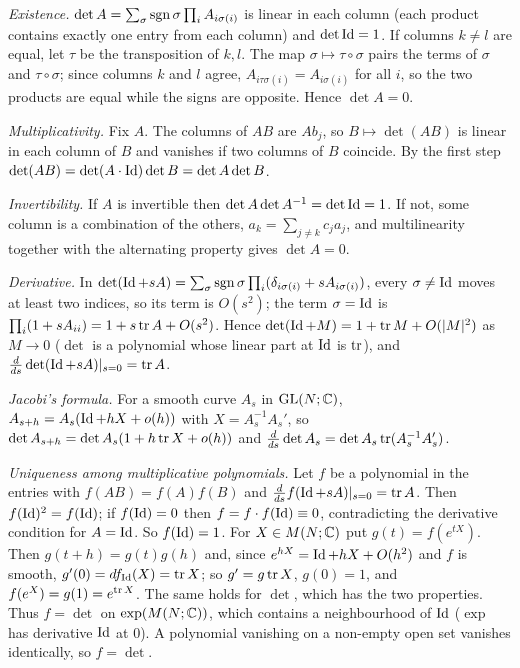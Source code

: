 \emph{Existence.} $\det A=\sum_\sigma\operatorname{sgn}\sigma\prod_iA_{i\sigma(i)}$ is linear in each column (each
product contains exactly one entry from each column) and $\det\operatorname{Id}=1$. If columns $k\neq l$ are equal,
let $\tau$ be the transposition of $k,l$. The map $\sigma\mapsto\tau\circ\sigma$ pairs the terms of
$\sigma$ and $\tau\circ\sigma$; since columns $k$ and $l$ agree, $A_{i\tau\sigma(i)}=A_{i\sigma(i)}$ for all $i$, so
the two products are equal while the signs are opposite. Hence $\det A=0$.

\emph{Multiplicativity.} Fix $A$. The columns of $AB$ are $Ab_j$, so $B\mapsto\det(AB)$ is linear in
each column of $B$ and vanishes if two columns of $B$ coincide. By the first step
$\det(AB)=\det(A\cdot\operatorname{Id})\det B=\det A\det B$.

\emph{Invertibility.} If $A$ is invertible then $\det A\det A^{-1}=\det\operatorname{Id}=1$. If not, some column is a
combination of the others, $a_k=\sum_{j\ne k}c_ja_j$, and multilinearity together with the alternating
property gives $\det A=0$.

\emph{Derivative.} In $\det(\operatorname{Id}+sA)=\sum_\sigma\operatorname{sgn}\sigma\prod_i(\delta_{i\sigma(i)}+sA_{i\sigma(i)})$, every
$\sigma\neq\operatorname{Id}$ moves at least two indices, so its term is $O(s^2)$; the term $\sigma=\operatorname{Id}$ is
$\prod_i(1+sA_{ii})=1+s\operatorname{tr} A+O(s^2)$. Hence $\det(\operatorname{Id}+M)=1+\operatorname{tr} M+O(|M|^2)$ as $M\to0$ ($\det$ is a
polynomial whose linear part at $\operatorname{Id}$ is $\operatorname{tr}$), and
$\frac d{ds}\det(\operatorname{Id}+sA)|_{s=0}=\operatorname{tr} A$.

\emph{Jacobi's formula.} For a smooth curve $A_s$ in $\operatorname{GL}(N;\mathbb{C})$,
$A_{s+h}=A_s(\operatorname{Id}+hX+o(h))$ with $X=A_s^{-1}A_s'$, so
$\det A_{s+h}=\det A_s(1+h\operatorname{tr} X+o(h))$ and $\frac d{ds}\det A_s=\det A_s\operatorname{tr}(A_s^{-1}A_s')$.

\emph{Uniqueness among multiplicative polynomials.} Let $f$ be a polynomial in the entries with
$f(AB)=f(A)f(B)$ and $\frac d{ds}f(\operatorname{Id}+sA)|_{s=0}=\operatorname{tr} A$. Then $f(\operatorname{Id})^2=f(\operatorname{Id})$; if $f(\operatorname{Id})=0$ then
$f=f\cdot f(\operatorname{Id})\equiv0$, contradicting the derivative condition for $A=\operatorname{Id}$. So $f(\operatorname{Id})=1$. For
$X\in M(N;\mathbb{C})$ put $g(t)=f(e^{tX})$. Then $g(t+h)=g(t)g(h)$ and, since $e^{hX}=\operatorname{Id}+hX+O(h^2)$ and $f$ is
smooth, $g'(0)=df_{\operatorname{Id}}(X)=\operatorname{tr} X$; so $g'=g\operatorname{tr} X$, $g(0)=1$, and $f(e^X)=g(1)=e^{\operatorname{tr} X}$. The same holds
for $\det$, which has the two properties. Thus $f=\det$ on $\exp(M(N;\mathbb{C}))$, which contains a
neighbourhood of $\operatorname{Id}$ ($\exp$ has derivative $\operatorname{Id}$ at $0$). A polynomial vanishing on a non-empty open
set vanishes identically, so $f=\det$.

